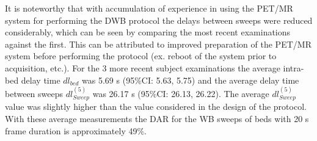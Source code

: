 It is noteworthy that with accumulation of experience in using the PET/MR system for performing the DWB protocol the delays between sweeps were reduced considerably, which can be seen by comparing the most recent examinations against the first. This can be attributed to improved preparation of the PET/MR system before performing the protocol (ex. reboot of the system prior to acquisition, etc.).
For the 3 more recent subject examinations the average intra-bed delay time ${dl_{bed}}$ was 5.69 s (95\%CI: 5.63, 5.75) and the average delay time between sweeps $dl_{Sweep}^{(5)}$ was 26.17 s (95\%CI: 26.13, 26.22).
The average $dl_{Sweep}^{(5)}$ value was slightly higher than the value considered in the design of the protocol. With these average measurements the DAR for the WB sweeps of beds with 20 s frame duration is approximately 49\%. \\

